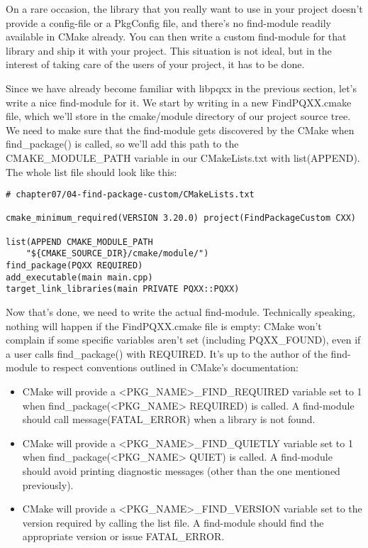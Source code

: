 On a rare occasion, the library that you really want to use in your project doesn't provide a config-file or a PkgConfig file, and there's no find-module readily available in CMake already. You can then write a custom find-module for that library and ship it with your project. This situation is not ideal, but in the interest of taking care of the users of your project, it has to be done.

Since we have already become familiar with libpqxx in the previous section, let's write a nice find-module for it. We start by writing in a new FindPQXX.cmake file, which we'll store in the cmake/module directory of our project source tree. We need to make sure that the find-module gets discovered by the CMake when find\_package() is called, so we'll add this path to the CMAKE\_MODULE\_PATH variable in our CMakeLists.txt with list(APPEND). The whole list file should look like this:

\begin{lstlisting}[style=styleCMake]
# chapter07/04-find-package-custom/CMakeLists.txt

cmake_minimum_required(VERSION 3.20.0) project(FindPackageCustom CXX) 

list(APPEND CMAKE_MODULE_PATH 
	"${CMAKE_SOURCE_DIR}/cmake/module/")
find_package(PQXX REQUIRED)
add_executable(main main.cpp)
target_link_libraries(main PRIVATE PQXX::PQXX)
\end{lstlisting}

Now that's done, we need to write the actual find-module. Technically speaking, nothing will happen if the FindPQXX.cmake file is empty: CMake won't complain if some specific variables aren't set (including PQXX\_FOUND), even if a user calls find\_package() with REQUIRED. It's up to the author of the find-module to respect conventions outlined in CMake's documentation:

\begin{itemize}
\item 
CMake will provide a <PKG\_NAME>\_FIND\_REQUIRED variable set to 1 when find\_package(<PKG\_NAME> REQUIRED) is called. A find-module should call message(FATAL\_ERROR) when a library is not found.

\item 
CMake will provide a <PKG\_NAME>\_FIND\_QUIETLY variable set to 1 when find\_package(<PKG\_NAME> QUIET) is called. A find-module should avoid printing diagnostic messages (other than the one mentioned previously).

\item 
CMake will provide a <PKG\_NAME>\_FIND\_VERSION variable set to the version required by calling the list file. A find-module should find the appropriate version or issue FATAL\_ERROR.
\end{itemize}

